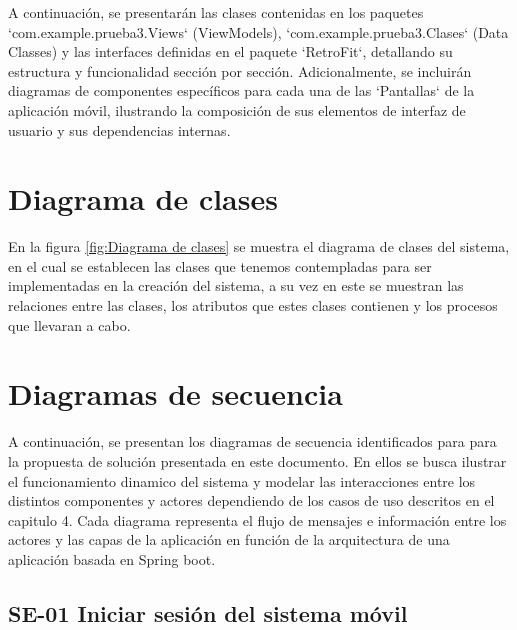 A continuación, se presentarán las clases contenidas en los paquetes `com.example.prueba3.Views` (ViewModels), `com.example.prueba3.Clases` (Data Classes) y las interfaces definidas en el paquete `RetroFit`, detallando su estructura y funcionalidad sección por sección. Adicionalmente, se incluirán diagramas de componentes específicos para cada una de las `Pantallas` de la aplicación móvil, ilustrando la composición de sus elementos de interfaz de usuario y sus dependencias internas.

\newpage

\newpage


\section{Diagrama de clases}

En la figura \ref{fig:Diagrama de clases} se muestra el diagrama de clases del sistema, en el cual se establecen las clases que tenemos contempladas para ser implementadas en la creación del sistema, a su vez en este se muestran las relaciones entre las clases, los atributos que estes clases contienen y los procesos que llevaran a cabo.

\newpage




\section{Diagramas de secuencia}

A continuación, se presentan los diagramas de secuencia identificados para para la propuesta de solución presentada en este documento.
En ellos se busca ilustrar el funcionamiento dinamico del sistema y modelar las interacciones entre los distintos componentes y actores dependiendo de los casos de uso descritos en el capitulo 4. 
Cada diagrama representa el flujo de mensajes e información entre los actores y las capas de la aplicación en función de la arquitectura de una aplicación basada en Spring boot.

\newpage

\subsection{SE-01 Iniciar sesión del sistema móvil}

